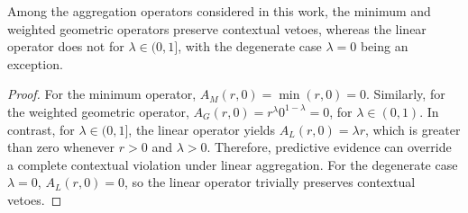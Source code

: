 \documentclass[mathematics,article,submit,moreauthors]{Definitions/mdpi}
\begin{document}
\begin{Corollary}
    \label{cor:veto-operators}
    Among the aggregation operators considered in this work, the minimum
    and weighted geometric operators preserve contextual vetoes, whereas
    the linear operator does not {\color{red}for \(\lambda\in(0,1]\), with the degenerate case \(\lambda=0\) being an exception}.
\end{Corollary}
\begin{proof}
    For the minimum operator, $A_M(r,0)=\min(r,0)=0$.
    Similarly, for the weighted geometric operator, $A_G(r,0)=r^\lambda 0^{1-\lambda}=0$, for $\lambda\in(0,1)$. In contrast, {\color{red}for \(\lambda\in(0,1]\),} the linear operator yields $A_L(r,0)=\lambda r$, which is greater than zero whenever $r>0$ and $\lambda>0$. Therefore, predictive evidence can override a complete contextual violation under linear aggregation. {\color{red}For the degenerate case \(\lambda=0\), \(A_L(r,0)=0\), so the linear operator trivially preserves contextual vetoes.}
\end{proof}
\end{document}
